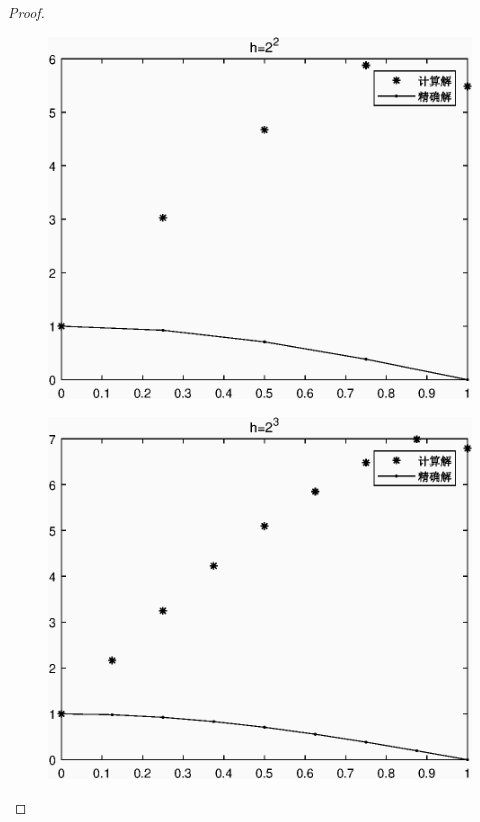 \documentclass{article}%
\begin{document}
\begin{proof}
	\begin{figure}[H]
	\includegraphics[width=1\linewidth]{week15_1_2.eps}
	\label{Fig:2}
	\end{figure}

	\begin{figure}[H]
	\includegraphics[width=1\linewidth]{week15_1_3.eps}
	\label{Fig:3}
	\end{figure}


\end{proof}
\end{document}
